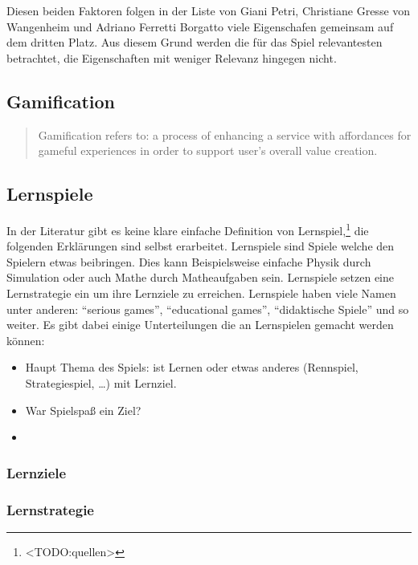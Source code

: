 	Diesen beiden Faktoren folgen in der Liste von Giani Petri, Christiane Gresse von Wangenheim und Adriano Ferretti Borgatto viele Eigenschafen gemeinsam auf dem dritten Platz. Aus diesem Grund werden die für das Spiel relevantesten betrachtet, die Eigenschaften mit weniger Relevanz hingegen nicht.



\subsection{Gamification}
	\begin{quote}
		\vspace{\baselineskip}\hfill\begin{minipage}{0.96\textwidth}
			Gamification refers to: a process of enhancing a service with affordances for gameful experiences in order to support user's overall value creation.
		\end{minipage}
	\end{quote}
\subsection{Lernspiele}
	In der Literatur gibt es keine klare einfache Definition von Lernspiel,\footnote{<TODO:quellen>} die folgenden Erklärungen sind selbst erarbeitet.
	Lernspiele sind Spiele welche den Spielern etwas beibringen. Dies kann Beispielsweise einfache Physik durch Simulation oder auch Mathe durch Matheaufgaben sein. Lernspiele setzen eine Lernstrategie ein um ihre Lernziele zu erreichen.
	Lernspiele haben viele Namen unter anderen: \enquote{serious games}, \enquote{educational games}, \enquote{didaktische Spiele} und so weiter.
	Es gibt dabei einige Unterteilungen die an Lernspielen gemacht werden können:
	\begin{itemize}
		\item{ Haupt Thema des Spiels: ist Lernen oder etwas anderes (Rennspiel, Strategiespiel, \dots) mit Lernziel. }
		\item{ War Spielspaß ein Ziel? }
		\item{  }
	\end{itemize}
	\subsubsection{Lernziele}

	\subsubsection{Lernstrategie}
